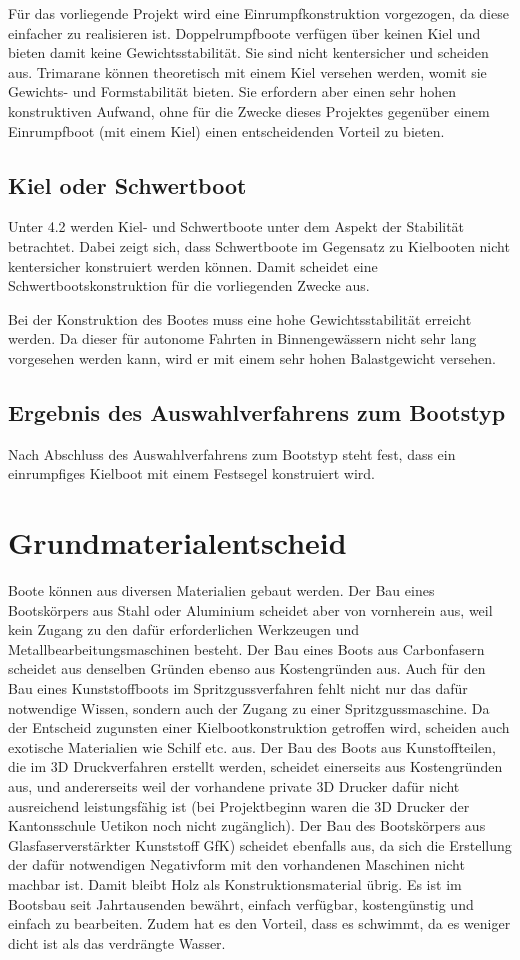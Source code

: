 Für das vorliegende Projekt wird eine Einrumpfkonstruktion vorgezogen, da diese einfacher zu realisieren ist. Doppelrumpfboote verfügen über keinen Kiel und bieten damit keine Gewichtsstabilität. Sie sind nicht kentersicher und scheiden aus. Trimarane können theoretisch mit einem Kiel versehen werden, womit sie Gewichts- und Formstabilität bieten. Sie erfordern aber einen sehr hohen konstruktiven Aufwand, ohne für die Zwecke dieses Projektes gegenüber einem Einrumpfboot (mit einem Kiel) einen entscheidenden Vorteil zu bieten. 
\subsection{Kiel oder Schwertboot}
Unter 4.2 werden Kiel- und Schwertboote unter dem Aspekt der Stabilität betrachtet. Dabei zeigt sich, dass Schwertboote im Gegensatz zu Kielbooten nicht kentersicher konstruiert werden können. Damit scheidet eine Schwertbootskonstruktion für die vorliegenden Zwecke aus.

Bei der Konstruktion des Bootes muss eine hohe Gewichtsstabilität erreicht werden. Da dieser für autonome Fahrten in Binnengewässern nicht sehr lang vorgesehen werden kann, wird er mit einem sehr hohen Balastgewicht versehen.
\subsection{Ergebnis des Auswahlverfahrens zum Bootstyp}
Nach Abschluss des Auswahlverfahrens zum Bootstyp steht fest, dass ein einrumpfiges Kielboot mit einem Festsegel konstruiert wird.
\section{Grundmaterialentscheid }
Boote können aus diversen Materialien gebaut werden. Der Bau eines Bootskörpers aus Stahl oder Aluminium scheidet aber von vornherein aus, weil kein Zugang zu den dafür erforderlichen Werkzeugen und Metallbearbeitungsmaschinen besteht. Der Bau eines Boots aus Carbonfasern scheidet aus denselben Gründen ebenso aus Kostengründen aus. Auch für den Bau eines Kunststoffboots im Spritzgussverfahren fehlt nicht nur das dafür notwendige Wissen, sondern auch der Zugang zu einer Spritzgussmaschine. Da der Entscheid zugunsten einer Kielbootkonstruktion getroffen wird, scheiden auch exotische Materialien wie Schilf etc. aus. Der Bau des Boots aus Kunstoffteilen, die im 3D Druckverfahren erstellt werden, scheidet einerseits aus Kostengründen aus, und andererseits weil der vorhandene private 3D Drucker dafür nicht ausreichend leistungsfähig ist (bei Projektbeginn waren die 3D Drucker der Kantonsschule Uetikon noch nicht zugänglich). Der Bau des Bootskörpers aus Glasfaserverstärkter Kunststoff GfK) scheidet ebenfalls aus, da sich die Erstellung der dafür notwendigen Negativform mit den vorhandenen Maschinen nicht machbar ist. Damit bleibt Holz als Konstruktionsmaterial übrig. Es ist im Bootsbau seit Jahrtausenden bewährt, einfach verfügbar, kostengünstig und einfach zu bearbeiten. Zudem hat es den Vorteil, dass es schwimmt, da es weniger dicht ist als das verdrängte Wasser.  

